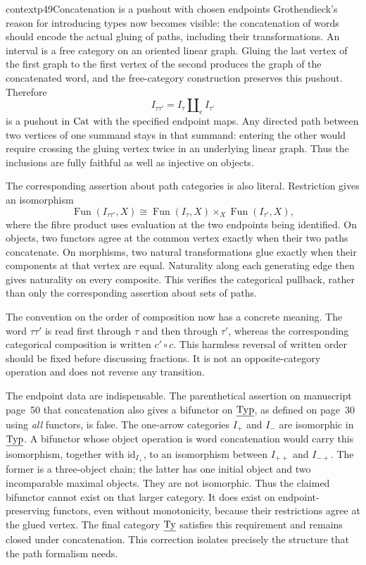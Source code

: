 \begin{dcomment}{context}{p49}{Concatenation is a pushout with chosen endpoints}
Grothendieck's reason for introducing types now becomes visible: the concatenation of words should encode the actual gluing of paths, including their transformations. An interval is a free category on an oriented linear graph. Gluing the last vertex of the first graph to the first vertex of the second produces the graph of the concatenated word, and the free-category construction preserves this pushout. Therefore
\[
 I_{\tau\tau'}=I_\tau\amalg_e I_{\tau'}
\]
is a pushout in $\mathrm{Cat}$ with the specified endpoint maps. Any directed path between two vertices of one summand stays in that summand: entering the other would require crossing the gluing vertex twice in an underlying linear graph. Thus the inclusions are fully faithful as well as injective on objects.

The corresponding assertion about path categories is also literal. Restriction gives an isomorphism
\[
 \operatorname{Fun}(I_{\tau\tau'},X)
 \cong
 \operatorname{Fun}(I_\tau,X)
 \times_X\operatorname{Fun}(I_{\tau'},X),
\]
where the fibre product uses evaluation at the two endpoints being identified. On objects, two functors agree at the common vertex exactly when their two paths concatenate. On morphisms, two natural transformations glue exactly when their components at that vertex are equal. Naturality along each generating edge then gives naturality on every composite. This verifies the categorical pullback, rather than only the corresponding assertion about sets of paths.

The convention on the order of composition now has a concrete meaning. The word $\tau\tau'$ is read first through $\tau$ and then through $\tau'$, whereas the corresponding categorical composition is written $c'\circ c$. This harmless reversal of written order should be fixed before discussing fractions. It is not an opposite-category operation and does not reverse any transition.

The endpoint data are indispensable. The parenthetical assertion on manuscript page~50 that concatenation also gives a bifunctor on $\underline{\mathrm{Typ}}$, as defined on page~30 using \emph{all} functors, is false. The one-arrow categories $I_+$ and $I_-$ are isomorphic in $\underline{\mathrm{Typ}}$. A bifunctor whose object operation is word concatenation would carry this isomorphism, together with $\mathrm{id}_{I_+}$, to an isomorphism between $I_{++}$ and $I_{-+}$. The former is a three-object chain; the latter has one initial object and two incomparable maximal objects. They are not isomorphic. Thus the claimed bifunctor cannot exist on that larger category. It does exist on endpoint-preserving functors, even without monotonicity, because their restrictions agree at the glued vertex. The final category $\underline{\mathrm{Ty}}$ satisfies this requirement and remains closed under concatenation. This correction isolates precisely the structure that the path formalism needs.
\end{dcomment}


